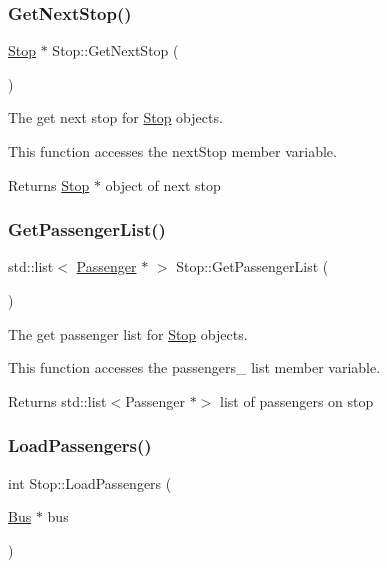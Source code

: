 \begin{figure}[H]
\begin{center}
\subsubsection{\texorpdfstring{Get\+Next\+Stop()}{GetNextStop()}}
{\footnotesize\ttfamily \hyperlink{classStop}{Stop} $\ast$ Stop\+::\+Get\+Next\+Stop (\begin{DoxyParamCaption}{ }\end{DoxyParamCaption})}



The get next stop for \hyperlink{classStop}{Stop} objects. 

This function accesses the next\+Stop member variable.

\begin{DoxyReturn}{Returns}
\hyperlink{classStop}{Stop} $\ast$ object of next stop 
\end{DoxyReturn}
\mbox{\label{classStop_a57c093d381664512dd576cf02a88bea6}} 
\subsubsection{\texorpdfstring{Get\+Passenger\+List()}{GetPassengerList()}}
{\footnotesize\ttfamily std\+::list$<$ \hyperlink{classPassenger}{Passenger} $\ast$ $>$ Stop\+::\+Get\+Passenger\+List (\begin{DoxyParamCaption}{ }\end{DoxyParamCaption})}



The get passenger list for \hyperlink{classStop}{Stop} objects. 

This function accesses the passengers\+\_\+ list member variable.

\begin{DoxyReturn}{Returns}
std\+::list$<$\+Passenger $\ast$$>$ list of passengers on stop 
\end{DoxyReturn}
\mbox{\label{classStop_a02c6dcba2b6de5fdd008cf623f19bf7c}} 
\subsubsection{\texorpdfstring{Load\+Passengers()}{LoadPassengers()}}
{\footnotesize\ttfamily int Stop\+::\+Load\+Passengers (\begin{DoxyParamCaption}\item[{\hyperlink{classBus}{Bus} $\ast$}]{bus }\end{DoxyParamCaption})}




\end{center}
\end{figure}
